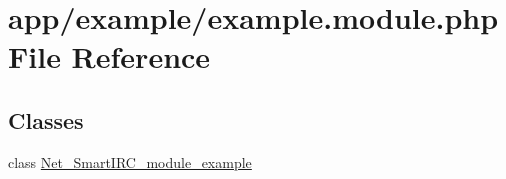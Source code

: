 \hypertarget{example_8module_8php}{}\section{app/example/example.module.\+php File Reference}
\label{example_8module_8php}
\subsection*{Classes}
\begin{DoxyCompactItemize}
\item 
class \hyperlink{classNet__SmartIRC__module__example}{Net\+\_\+\+Smart\+I\+R\+C\+\_\+module\+\_\+example}
\end{DoxyCompactItemize}
